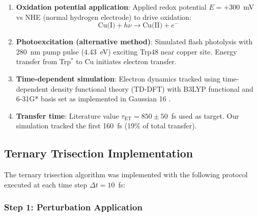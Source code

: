 \documentclass[twocolumn,10pt]{article}
\begin{document}
\begin{enumerate}
\item \textbf{Oxidation potential application}: Applied redox potential 
$E = +300$~mV vs NHE (normal hydrogen electrode) to drive oxidation:
%
\begin{equation}
\text{Cu(I)} + h\nu \to \text{Cu(II)} + e^-
\label{eq:oxidation}
\end{equation}

\item \textbf{Photoexcitation (alternative method)}: Simulated flash photolysis 
with 280~nm pump pulse (4.43~eV) exciting Trp48 near copper site. Energy transfer 
from Trp$^*$ to Cu initiates electron transfer.

\item \textbf{Time-dependent simulation}: Electron dynamics tracked using 
time-dependent density functional theory (TD-DFT) with B3LYP functional and 
6-31G* basis set as implemented in Gaussian 16 \cite{Frisch2016}.

\item \textbf{Transfer time}: Literature value $\tau_{\text{ET}} = 850 \pm 50$~fs 
\cite{Crane2001} used as target. Our simulation tracked the first 160~fs 
(19\% of total transfer).
\end{enumerate}

\subsection{Ternary Trisection Implementation}

The ternary trisection algorithm was implemented with the following protocol 
executed at each time step $\Delta t = 10$~fs:

\subsubsection{Step 1: Perturbation Application}
\end{document}
